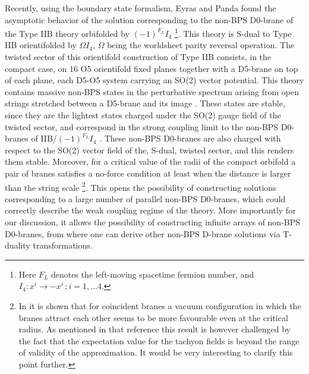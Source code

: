 \documentclass[12pt,a4paper]{article}
\begin{document}
Recently, using the boundary state formalism, Eyras and Panda \cite{EP}
found the asymptotic behavior of the solution corresponding to the
non-BPS D0-brane of the Type IIB theory orbifolded by
$(-1)^{F_L}I_4$ \cite{Sen2,BG}\footnote{Here $F_L$ denotes the left-moving
spacetime fermion number, and $I_4:x^i\rightarrow -x^i\,;i=1,\dots 4$.}.
This theory is S-dual to Type IIB orientifolded by
$\Omega I_4$, $\Omega$ being the worldsheet
parity reversal operation. The twisted sector of this orientifold
construction of Type IIB consists, in the compact case, on 16 O5 orientifold
fixed planes together with a D5-brane on top of each 
plane, each D5-O5 system carrying an SO(2)
vector potential. This theory contains
massive non-BPS states in the perturbative spectrum arising from
open strings stretched between a D5-brane and its image \cite{Sen*}. 
These states are stable, since they are the lightest states
charged under the SO(2) gauge
field of the twisted sector, and correspond in the strong coupling limit 
to the non-BPS D0-branes of IIB/$(-1)^{F_L}I_4$ \cite{Sen2,BG}.
These non-BPS D0-branes are also charged with respect to the
SO(2) vector field of the, S-dual, twisted sector, and this renders 
them stable.
Moreover, for a critical value of the radii of the compact orbifold
a pair of branes satisfies a no-force condition at least when the
distance is larger than the string scale 
\cite{GS,MOT}\footnote{In \cite{LS} it is shown that for coincident
branes a vacuum configuration in which the branes attract each other
seems to be more favourable even at the critical radius.
As mentioned in that reference
this result is however challenged by the fact that 
the expectation value for the tachyon fields is beyond the range 
of validity of the approximation. It would be very interesting
to clarify this point further.}. 
This opens the possibility of constructing solutions 
corresponding to a large number of parallel non-BPS D0-branes, 
which could correctly describe
the weak coupling regime of the theory. More importantly for our
discussion, it allows the possibility of constructing 
infinite arrays of non-BPS
D0-branes, from where one can derive other non-BPS D-brane
solutions via T-duality transformations.
\end{document}
